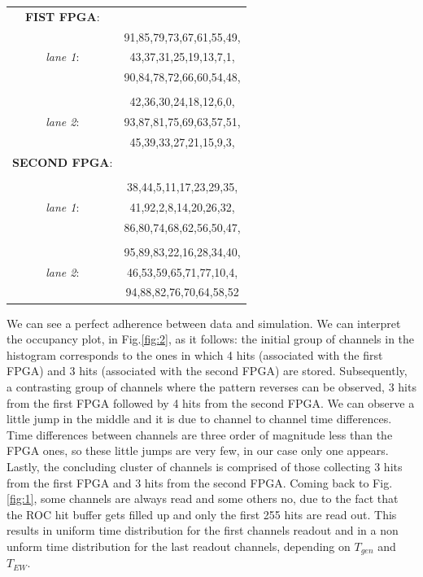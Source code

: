 \begin{center}
\begin{tabular}{cc}
\textbf{FIST FPGA}: & \\
&91,85,79,73,67,61,55,49,\\
\textit{lane 1}: &43,37,31,25,19,13,7,1,\\
&90,84,78,72,66,60,54,48,\\
& \\
&42,36,30,24,18,12,6,0,\\
\textit{lane 2}: &93,87,81,75,69,63,57,51,\\
&45,39,33,27,21,15,9,3,\\
\textbf{SECOND FPGA}:&\\
&\\
&38,44,5,11,17,23,29,35,\\
\textit{lane 1}:&41,92,2,8,14,20,26,32,\\
&86,80,74,68,62,56,50,47,\\
 & \\
&95,89,83,22,16,28,34,40,\\
\textit{lane 2}:&46,53,59,65,71,77,10,4,\\
&94,88,82,76,70,64,58,52\\
\end{tabular}
\end{center}   
We can see a perfect adherence between data and simulation. We can interpret the occupancy plot, in Fig.\ref{fig:2}, as it follows: the initial group of channels in the histogram corresponds to the ones in which 4 hits (associated with the first FPGA) and 3 hits (associated with the second FPGA) are stored. 
Subsequently, a contrasting group of channels where the pattern reverses can be observed, 3 hits from the first FPGA followed by 4 hits from the second FPGA.
We can observe a little jump in the middle and it is due to channel to channel time differences.
Time differences between channels are three order of magnitude less than the FPGA ones, so these little jumps are very few, in our case only one appears.
Lastly, the concluding cluster of channels is comprised of those collecting 3 hits from the first FPGA and 3 hits from the second FPGA.
Coming back to Fig.\ref{fig:1}, some channels are always read and some others no, due to the fact that the ROC hit buffer gets filled up and only the first 255 hits are read out. This results in uniform time distribution for the first channels readout and in a non unform time distribution for the last readout channels, depending on $T_{gen}$ and $T_{EW}$. 


